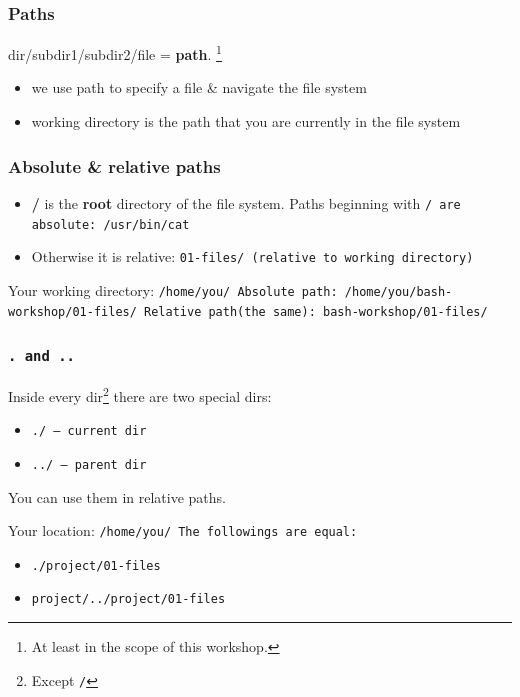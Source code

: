 \begin{frame}
\frametitle{Paths}
    dir/subdir1/subdir2/file = \textbf{path}.
\footnote{At least in the scope of this workshop.}
\newline

\begin{itemize}
    \item we use path to specify a file \& navigate the file system
    \item working directory is the path that you are currently in the file system
\end{itemize}
\end{frame}

\begin{frame}
\frametitle{Absolute \& relative paths}
\begin{itemize}
    \item \textbf{/} is the \textbf{root} directory of the file system. Paths beginning with \tt{/} are absolute: \tt{/usr/bin/cat}
    \item Otherwise it is relative: \tt{01-files/} (relative to working directory)
\end{itemize}


\begin{example}
    Your working directory: \tt{/home/you/} \newline
    Absolute path: \tt{/home/you/bash-workshop/01-files/} \newline
    Relative path(the same): \tt{bash-workshop/01-files/} \newline
\end{example}
\end{frame}

\begin{frame}
\frametitle{\tt{.} and \tt{..}}
Inside every dir\footnote{Except \tt{/}} there are two special dirs:
\begin{itemize}
    \item \tt{./} — current dir
    \item \tt{../} — parent dir
\end{itemize}

You can use them in relative paths.
\begin{example}
    Your location: \tt{/home/you/} \newline
    The followings are equal:
    \begin{itemize}
        \item \tt{./project/01-files}
        \item \tt{project/../project/01-files}
    \end{itemize}
\end{example}
\end{frame}

